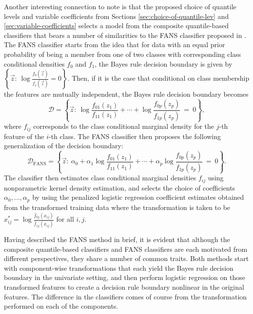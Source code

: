 Another interesting connection to note is that the proposed choice of quantile
levels and variable coefficients from Sections \ref{sec:choice-of-quantile-lev}
and \ref{sec:variable-coefficients} selects a model from the composite
quantile-based classifiers that bears a number of similarities to the FANS
classifier proposed in \cite{fan2016}.  The FANS classifier starts from the idea
that for data with an equal prior probability of being a member from one of two
classes with corresponding class conditional densities $f_0$ and $f_1$, the
Bayes rule decision boundary is given by
$\left\{ \vec{z}{:}~ \log \frac{ f_0(\vec{z}) }{ f_1(\vec{z}) } = 0 \right\}$.
Then, if it is the case that conditional on class membership the features are
mutually independent, the Bayes rule decision boundary becomes
\begin{equation}
  \label{eq:bayes-rule-independent}
  \mathcal{D} = \left\{
    \vec{z} :~
    \log \frac{ f_{01}(z_1) }{ f_{11}(z_1) } +
    \cdots +
    \log \frac{ f_{0p}(z_p) }{ f_{1p}(z_p) }
    ~=~ 0
  \right\} ,
\end{equation}
where $f_{ij}$ corresponds to the class conditional marginal density for the
$j$-th feature of the $i$-th class.  The FANS classifier then proposes the
following generalization of the decision boundary:
\begin{equation}
  \label{eq:fans-rule}
  \mathcal{D}_{\scriptscriptstyle \text{FANS}} = \left\{
    \vec{z} :~ \alpha_0 + 
    \alpha_1 \log \frac{ f_{01}(z_1) }{ f_{11}(z_1) } +
    \cdots +
    \alpha_p \log \frac{ f_{0p}(z_p) }{ f_{1p}(z_p) }
    ~=~ 0
  \right\}.
\end{equation}
The classifier then estimates class conditional marginal densities $f_{ij}$
using nonparametric kernel density estimation, and selects the choice of
coefficients $\alpha_0, \dots, \alpha_p$ by using the penalized logistic
regression coefficient estimates obtained from the transformed training data
where the transformation is taken to be
$x_{ij}^{*} = \log \frac{ \hat{f}_{0j}(x_{ij}) }{ \hat{f}_{1j}(x_{ij}) }$ for
all $i, j$.

Having described the FANS method in brief, it is evident that although the
composite quantile-based classifiers and FANS classifiers are each motivated
from different perspectives, they share a number of common traits.  Both methods
start with component-wise transformations that each yield the Bayes rule
decision boundary in the univariate setting, and then perform logistic
regression on those transformed features to create a decision rule boundary
nonlinear in the original features.  The difference in the classifiers comes of
course from the transformation performed on each of the components.

